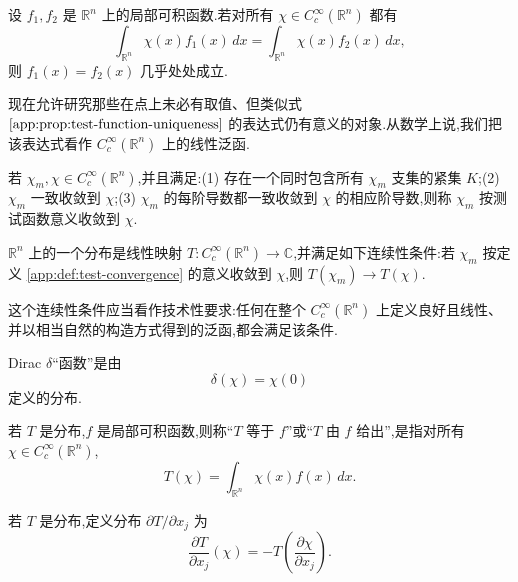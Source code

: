 \begin{proposition}\label{app:prop:test-function-uniqueness}
设 \(f_1,f_2\) 是 \(\mathbb R^n\) 上的局部可积函数.若对所有 \(\chi\in C_c^\infty(\mathbb R^n)\) 都有
\[
\int_{\mathbb R^n}\chi(x)f_1(x)\,dx
=\int_{\mathbb R^n}\chi(x)f_2(x)\,dx,
\]
则 \(f_1(x)=f_2(x)\) 几乎处处成立.
\end{proposition}

现在允许研究那些在点上未必有取值、但类似式 \(\ref{app:prop:test-function-uniqueness}\) 的表达式仍有意义的对象.从数学上说,我们把该表达式看作 \(C_c^\infty(\mathbb R^n)\) 上的线性泛函.

\begin{definition}[测试函数的收敛]\label{app:def:test-convergence}
若 \(\chi_m,\chi\in C_c^\infty(\mathbb R^n)\),并且满足:(1) 存在一个同时包含所有 \(\chi_m\) 支集的紧集 \(K\);(2) \(\chi_m\) 一致收敛到 \(\chi\);(3) \(\chi_m\) 的每阶导数都一致收敛到 \(\chi\) 的相应阶导数,则称 \(\chi_m\) 按测试函数意义收敛到 \(\chi\).
\end{definition}

\begin{definition}[分布]\label{app:def:distribution}
\(\mathbb R^n\) 上的一个分布是线性映射 \(T:C_c^\infty(\mathbb R^n)\to\mathbb C\),并满足如下连续性条件:若 \(\chi_m\) 按定义 \ref{app:def:test-convergence} 的意义收敛到 \(\chi\),则 \(T(\chi_m)\to T(\chi)\).
\end{definition}

这个连续性条件应当看作技术性要求:任何在整个 \(C_c^\infty(\mathbb R^n)\) 上定义良好且线性、并以相当自然的构造方式得到的泛函,都会满足该条件.

\begin{example}\label{app:ex:dirac}
Dirac \(\delta\)“函数”是由
\[
\delta(\chi)=\chi(0)
\]
定义的分布.
\end{example}

\begin{definition}[由函数给出的分布]\label{app:def:distribution-function}
若 \(T\) 是分布,\(f\) 是局部可积函数,则称“\(T\) 等于 \(f\)”或“\(T\) 由 \(f\) 给出”,是指对所有 \(\chi\in C_c^\infty(\mathbb R^n)\),
\[
T(\chi)=\int_{\mathbb R^n}\chi(x)f(x)\,dx.
\]
\end{definition}

\begin{definition}[分布导数]\label{app:def:distribution-derivative}
若 \(T\) 是分布,定义分布 \(\partial T/\partial x_j\) 为
\[
\frac{\partial T}{\partial x_j}(\chi)
=-T\!\left(\frac{\partial\chi}{\partial x_j}\right).
\]
\end{definition}

